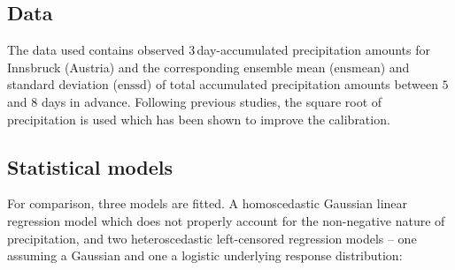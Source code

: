 \documentclass[twoside]{report}
\begin{document}



\subsection{Data}

The data used contains observed 3\,day-accumulated precipitation amounts for
Innsbruck (Austria) and the corresponding ensemble mean ($\text{ensmean}$) and
standard deviation ($\text{enssd}$) of total accumulated precipitation amounts
between $5$ and $8$ days in advance.
Following previous studies, the square root of precipitation is used which has
been shown to improve the calibration.


\subsection{Statistical models}

For comparison, three models are fitted. A homoscedastic Gaussian linear regression
model which does not properly account for the non-negative nature of precipitation,
and two heteroscedastic left-censored regression models --
one assuming a Gaussian and one a logistic underlying response distribution:
\end{document}

